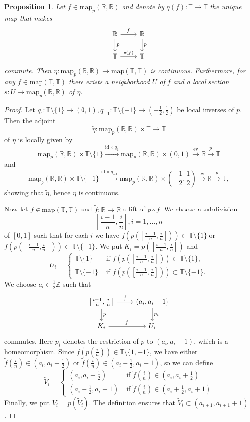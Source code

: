 \documentclass[8pt, oneside]{article}
\newtheorem{prop}[thm]{Proposition}
\theoremstyle{definition}
\newcommand{\id}{\mathrm{id}}
\newcommand{\RR}{\mathbb{R}}
\newcommand{\ZZ}{\mathbb{Z}}
\newcommand{\TT}{\mathbb{T}}
\newcommand{\map}{\mathrm{map}}
\begin{document}
\begin{prop}
Let $f\in \map_p(\RR,\RR)$ and denote by $\eta(f):\TT\to \TT$ the unique map
that makes 
$$
\begin{tikzcd}
\RR \arrow{r}{f}\arrow{d}{p}
&\RR\arrow{d}{p}\\
\TT\arrow{r}{\eta(f)}
&\TT
\end{tikzcd}
$$
commute. Then $\eta:\map_p(\RR,\RR)\rightarrow \map(\TT,\TT)$ is continuous.
Furthermore,  for any $f\in \map(\TT, \TT)$ there exists a neighborhood $U$
of $f$ and a local section $s:U\rightarrow \map_p(\RR,\RR)$ of $\eta$.
\end{prop}
\begin{proof}
Let $q_1:\TT\setminus\{1\}\rightarrow (0,1), q_{-1}:\TT\setminus\{-1\}\to \left(-\frac12, \frac12\right)$
be local inverses of $p$. Then the adjoint
$$\tilde \eta:\map_p(\RR,\RR)\times \TT\to \TT$$
of $\eta$ is locally given by
$$\map_p(\RR,\RR)\times \TT\setminus\{1\}\xrightarrow{\id\times q_1}
\map_p(\RR,\RR)\times (0,1)\xrightarrow{\mathrm{ev}}\RR
\xrightarrow{p} \TT$$
and
$$\map_p(\RR,\RR)\times \TT\setminus\{-1\}\xrightarrow{\id\times q_{-1}}
\map_p(\RR,\RR)\times \left(-\frac12,\frac12\right)\xrightarrow{\mathrm{ev}}\RR
\xrightarrow{p} \TT,$$
showing that $\tilde \eta$, hence $\eta$ is continuous.

Now let $f\in \map(\TT,\TT)$ and $\tilde f:\RR\to \RR$ a lift of $p\circ f$.
We choose a subdivision $$\left[\frac{i-1}{n}, \frac{i}{n}\right], i = 1,\ldots ,n$$ of $[0,1]$
such that for each $i$ we have $f(p([\frac{i-1}{n}, \frac{i}{n}]))\subset \TT\setminus\{1\}$ 
or $f(p([\frac{i-1}{n}, \frac{i}{n}]))\subset \TT\setminus\{-1\}$. We put $K_i = p([\frac{i-1}{n}, \frac{i}{n}])$
and 
$$U_i = 
\begin{cases}
\TT\setminus\{1\} &\text{ if } f(p([\frac{i-1}{n}, \frac{i}{n}]))\subset \TT\setminus\{1\},\\
\TT\setminus\{-1\} &\text{ if } f(p([\frac{i-1}{n}, \frac{i}{n}]))\subset \TT\setminus\{-1\}.
\end{cases}$$
We choose $a_i\in \frac12 \ZZ$ such that 
$$
\begin{tikzcd}
\left [\frac{i-1}{n}, \frac{i}{n} \right ]
\arrow{r}{\tilde f}
\arrow{d}{p}
&(a_i, a_i+1)\arrow{d}{p_i}\\
K_i\arrow{r}{f}
&U_i
\end{tikzcd}
$$
commutes. Here $p_i$ denotes the restriction of $p$ to $(a_i, a_i+1)$, which is a homeomorphism.
Since $f(p(\frac{i}{n}))\in \TT\setminus\{1, -1\}$, we have either
$\tilde f(\frac{i}{n})\in \left(a_i, a_i+\frac12\right)$ or $\tilde f(\frac{i}{n})\in \left(a_i +\frac12, a_i +1\right)$, so we can define
$$\tilde V_i = 
\begin{cases}
 \left(a_i, a_i+\frac12\right) &\text{ if } \tilde f(\frac{i}{n})\in \left(a_i, a_i+\frac12\right)\\
 \left(a_i +\frac12, a_i +1\right) &\text{ if } 
 \tilde f(\frac{i}{n})\in \left(a_i +\frac12, a_i +1\right)
\end{cases}$$
Finally, we put $V_i = p(\tilde V_i)$. The definition ensures that 
$\tilde V_i\subset (a_{i+1}, a_{i+1}+1)$.


\end{proof}
\end{document}
